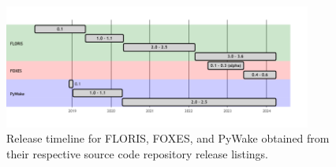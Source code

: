\documentclass{iopconfser}
\begin{document}
\begin{figure}[!htb]
  \centering
  \includegraphics[width=0.9\textwidth]{model_timelines.png}
  \caption{Release timeline for FLORIS, FOXES, and PyWake obtained from their respective source code repository release listings.}
  \label{fig:software_releases}
\end{figure}
\end{document}
